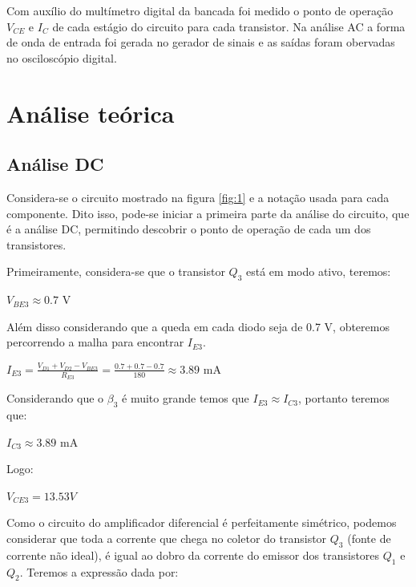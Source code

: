 Com auxílio do multímetro digital da bancada foi medido o ponto de operação $V_{CE}$ e $I_C$ de cada estágio do circuito para cada transistor. Na análise AC a forma de onda de entrada foi gerada no gerador de sinais e as saídas foram obervadas no osciloscópio digital.

\section{Análise teórica}

\subsection{Análise DC}

Considera-se o circuito mostrado na figura \ref{fig:1} e a notação usada para cada componente. Dito isso, pode-se iniciar a primeira parte da análise do circuito, que é a análise DC, permitindo descobrir o ponto de operação de cada um dos transistores.


Primeiramente, considera-se que o transistor $Q_3$ está em modo ativo, teremos:

\begin{center}
    $V_{BE3}\approx 0.7$ V
\end{center}

Além disso considerando que a queda em cada diodo seja de 0.7 V, obteremos percorrendo a malha para encontrar $I_{E3}$.

\begin{center}
    $I_{E3} = \frac{V_{D1}+V_{D2}-V_{BE3}}{R_{E3}} = \frac{0.7+0.7-0.7}{180} \approx 3.89$ mA
\end{center}

Considerando que o $\beta_{3}$ é muito grande temos que $I_{E3}\approx I_{C3}$, portanto teremos que:

\begin{center}
    $I_{C3} \approx 3.89$ mA
\end{center}

Logo:

\begin{center}
    $V_{CE3} = 13.53V$ 
\end{center}

Como o circuito do amplificador diferencial é perfeitamente simétrico, podemos considerar que toda a corrente que chega no coletor do transistor $Q_3$ (fonte de corrente não ideal), é igual ao dobro da corrente do emissor dos transistores $Q_1$ e $Q_2$. Teremos a expressão dada por:

